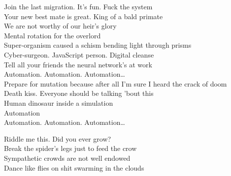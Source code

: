 \label{album:kg}








Join the last migration. It's fun. Fuck the system \\
Your new best mate is great. King of a bald primate \\
We are not worthy of our heir's glory \\
Mental rotation for the overlord \\

Super-organism caused a schism bending light through prisms \\
Cyber-surgeon. JavaScript person. Digital cleanse \\
Tell all your friends the neural network's at work \\

Automation. Automation. Automation… \\

Prepare for mutation because after all I'm sure I heard the crack of doom \\
Death kiss. Everyone should be talking 'bout this \\
Human  dinosaur inside a simulation \\
Automation \\

Automation. Automation. Automation… \\




Riddle me this. Did you ever grow? \\
Break the spider's legs just to feed the crow \\
Sympathetic crowds are not well endowed \\
Dance like flies on shit swarming in the clouds \\


